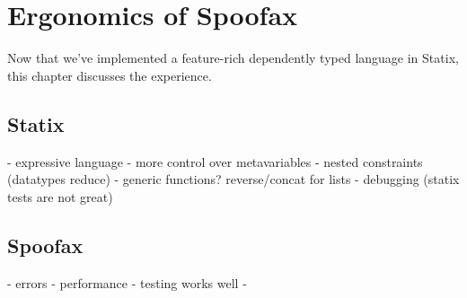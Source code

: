 \chapter{Ergonomics of Spoofax}

Now that we've implemented a feature-rich dependently typed language in Statix, this chapter discusses the experience. 

\section{Statix}

- expressive language
- more control over metavariables
- nested constraints (datatypes reduce)
- generic functions? reverse/concat for lists
- debugging (statix tests are not great)

\section{Spoofax}

- errors
- performance
- testing works well
- 